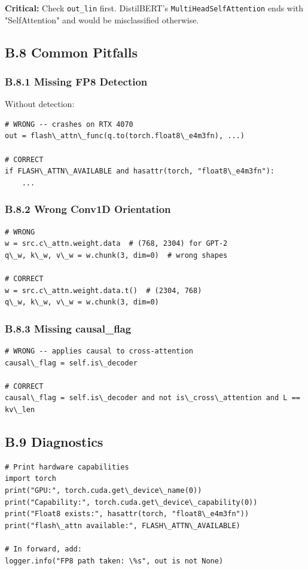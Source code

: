 \textbf{Critical:} Check \texttt{out\_lin} first. DistilBERT's \texttt{MultiHeadSelfAttention} 
ends with "SelfAttention" and would be misclassified otherwise.

\subsection{B.8 Common Pitfalls}

\subsubsection{B.8.1 Missing FP8 Detection}

Without detection:

\begin{lstlisting}
# WRONG -- crashes on RTX 4070
out = flash\_attn\_func(q.to(torch.float8\_e4m3fn), ...)

# CORRECT
if FLASH\_ATTN\_AVAILABLE and hasattr(torch, "float8\_e4m3fn"):
    ...
\end{lstlisting}

\subsubsection{B.8.2 Wrong Conv1D Orientation}

\begin{lstlisting}
# WRONG
w = src.c\_attn.weight.data  # (768, 2304) for GPT-2
q\_w, k\_w, v\_w = w.chunk(3, dim=0)  # wrong shapes

# CORRECT
w = src.c\_attn.weight.data.t()  # (2304, 768)
q\_w, k\_w, v\_w = w.chunk(3, dim=0)
\end{lstlisting}

\subsubsection{B.8.3 Missing causal\_flag}

\begin{lstlisting}
# WRONG -- applies causal to cross-attention
causal\_flag = self.is\_decoder

# CORRECT
causal\_flag = self.is\_decoder and not is\_cross\_attention and L == kv\_len
\end{lstlisting}

\subsection{B.9 Diagnostics}

\begin{lstlisting}
# Print hardware capabilities
import torch
print("GPU:", torch.cuda.get\_device\_name(0))
print("Capability:", torch.cuda.get\_device\_capability(0))
print("Float8 exists:", hasattr(torch, "float8\_e4m3fn"))
print("flash\_attn available:", FLASH\_ATTN\_AVAILABLE)

# In forward, add:
logger.info("FP8 path taken: \%s", out is not None)
\end{lstlisting}

